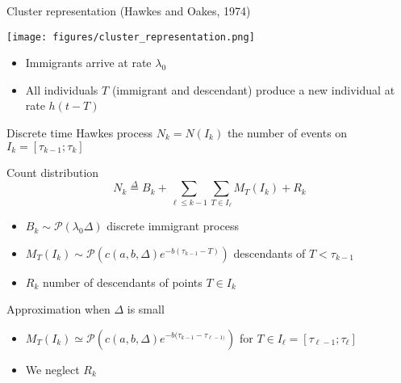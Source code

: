 \documentclass[french,english]{beamer}
\begin{document}
\begin{frame}{Cluster representation (Hawkes and Oakes, 1974)}

\texttt{[image: figures/cluster\_representation.png]}

\begin{itemize}
\item Immigrants arrive at rate $\lambda_0$ 
\item All individuals $T$ (immigrant and descendant) produce a new individual at rate $h(t - T)$
\end{itemize}
\end{frame}
\begin{frame}{Discrete time Hawkes process}
$N_k=N(I_k)$ the number of events on $I_k=[ \tau_{k-1};\tau_k]$
\begin{block}{Count distribution}
$$N_k \overset{\Delta}{=} B_k + \sum_{\ell \leq k-1} \sum_{T \in I_\ell} M_T(I_k) + R_k
$$
\end{block}
\small
   \begin{itemize}
       \item $B_k \sim \mathcal{P}(\lambda_0 \Delta)$ discrete immigrant process
 \item $ M_T(I_k) \sim \mathcal{P}\left(c(a,b,\Delta) e^{-b(\tau_{k-1}-T)}\right)$ descendants of $T<\tau_{k-1}$

 \item $R_k$ number of descendants of points $T \in I_k$
   \end{itemize}

\begin{block}{Approximation when $\Delta$ is small}
    \begin{itemize}
        \item  $ M_T(I_k) \simeq \mathcal{P}\left(c(a,b,\Delta) e^{-b(\tau_{k-1}-\tau_{\ell-1)}}\right)$ for $T \in  I_\ell=[\tau_{\ell-1}; \tau_\ell]$
        \item We neglect $R_k$
    \end{itemize}
\end{block}
\end{frame}
\end{document}
